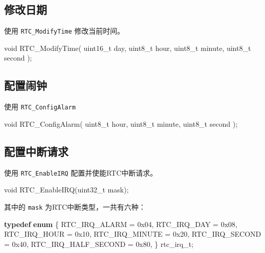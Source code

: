 \documentclass[
  12pt,
]{book}
\newenvironment{Shaded}{\begin{snugshade}}{\end{snugshade}}
\newcommand{\BaseNTok}[1]{\textcolor[rgb]{0.00,0.00,0.81}{#1}}
\newcommand{\DataTypeTok}[1]{\textcolor[rgb]{0.13,0.29,0.53}{#1}}
\newcommand{\KeywordTok}[1]{\textcolor[rgb]{0.13,0.29,0.53}{\textbf{#1}}}
\newcommand{\NormalTok}[1]{#1}
\begin{document}
\hypertarget{ux4feeux6539ux65e5ux671f}{%
\subsection{修改日期}\label{ux4feeux6539ux65e5ux671f}}

使用 \texttt{RTC\_ModifyTime} 修改当前时间。

\begin{Shaded}
\begin{Highlighting}[]
\DataTypeTok{void}\NormalTok{ RTC_ModifyTime(}
  \DataTypeTok{uint16_t}\NormalTok{ day, }
  \DataTypeTok{uint8_t}\NormalTok{ hour, }
  \DataTypeTok{uint8_t}\NormalTok{ minute, }
  \DataTypeTok{uint8_t}\NormalTok{ second}
\NormalTok{  );}
\end{Highlighting}
\end{Shaded}

\hypertarget{ux914dux7f6eux95f9ux949f}{%
\subsection{配置闹钟}\label{ux914dux7f6eux95f9ux949f}}

使用 \texttt{RTC\_ConfigAlarm}

\begin{Shaded}
\begin{Highlighting}[]
\DataTypeTok{void}\NormalTok{ RTC_ConfigAlarm(}
  \DataTypeTok{uint8_t}\NormalTok{ hour, }
  \DataTypeTok{uint8_t}\NormalTok{ minute, }
  \DataTypeTok{uint8_t}\NormalTok{ second}
\NormalTok{  );}
\end{Highlighting}
\end{Shaded}

\hypertarget{ux914dux7f6eux4e2dux65adux8bf7ux6c42-1}{%
\subsection{配置中断请求}\label{ux914dux7f6eux4e2dux65adux8bf7ux6c42-1}}

使用 \texttt{RTC\_EnableIRQ} 配置并使能RTC中断请求。

\begin{Shaded}
\begin{Highlighting}[]
\DataTypeTok{void}\NormalTok{ RTC_EnableIRQ(}\DataTypeTok{uint32_t}\NormalTok{ mask);}
\end{Highlighting}
\end{Shaded}

其中的 \texttt{mask} 为RTC中断类型，一共有六种：

\begin{Shaded}
\begin{Highlighting}[]
\KeywordTok{typedef} \KeywordTok{enum}
\NormalTok{\{}
\NormalTok{    RTC_IRQ_ALARM = }\BaseNTok{0x04}\NormalTok{,}
\NormalTok{    RTC_IRQ_DAY = }\BaseNTok{0x08}\NormalTok{,}
\NormalTok{    RTC_IRQ_HOUR = }\BaseNTok{0x10}\NormalTok{,}
\NormalTok{    RTC_IRQ_MINUTE = }\BaseNTok{0x20}\NormalTok{,}
\NormalTok{    RTC_IRQ_SECOND = }\BaseNTok{0x40}\NormalTok{,}
\NormalTok{    RTC_IRQ_HALF_SECOND = }\BaseNTok{0x80}\NormalTok{,}
\NormalTok{\} rtc_irq_t;}
\end{Highlighting}
\end{Shaded}
\end{document}
